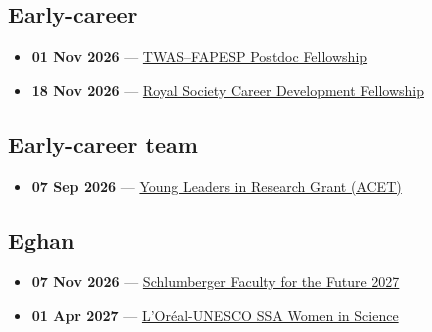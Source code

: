 \subsection*{Early-career}
\begin{itemize}[leftmargin=1.4em,itemsep=0.1em]
  \item \textbf{01 Nov 2026} --- \href{https://www.twas.org/opportunity/twas-fapesp-postdoctoral-fellowship-programme-developing-countries}{TWAS--FAPESP Postdoc Fellowship}
  \item \textbf{18 Nov 2026} --- \href{https://royalsociety.org/grants/career-development-fellowship/}{Royal Society Career Development Fellowship}
\end{itemize}

\subsection*{Early-career team}
\begin{itemize}[leftmargin=1.4em,itemsep=0.1em]
  \item \textbf{07 Sep 2026} --- \href{https://www2.fundsforngos.org/leadership/young-leaders-in-research-grant-for-early-career-african-researchers/}{Young Leaders in Research Grant (ACET)}
\end{itemize}

\subsection*{Eghan}
\begin{itemize}[leftmargin=1.4em,itemsep=0.1em]
  \item \textbf{07 Nov 2026} --- \href{https://schlumbergerfoundation.com/apply-now/}{Schlumberger Faculty for the Future 2027}
  \item \textbf{01 Apr 2027} --- \href{https://www.fondationloreal.com/our-programs-women-science-national-and-regional-young-talents-programs/sub-saharan-africa-young}{L'Oréal-UNESCO SSA Women in Science}
\end{itemize}

